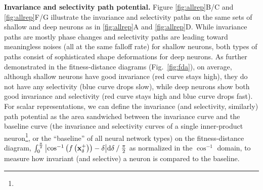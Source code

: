 \documentclass[10pt,twocolumn,letterpaper]{article}
\begin{document}
{\bf Invariance and selectivity path potential.} Figure \ref{fig:allrep}B/C and \ref{fig:allrep}F/G illustrate the invariance and selectivity paths on the same sets of shallow and deep neurons as in \ref{fig:allrep}A and \ref{fig:allrep}D.
While invariance paths are mostly phase changes and selectivity paths are leading toward meaningless noises (all at the same falloff rate) for shallow neurons, both types of paths consist of sophisticated shape deformations for deep neurons.
As further demonstrated in the fitness-distance diagrams \cite{jones1995fitness} (Fig.~\ref{fig:fda}), on average, although shallow neurons have good invariance (\ie red curve stays high), they do not have any selectivity (\ie blue curve drops slow), while deep neurons show both good invariance and selectivity (\ie red curve stays high and blue curve drops fast).
For scalar representations, we can define the invariance (and selectivity, similarly) path potential as the area sandwiched between the invariance curve and the baseline curve (\ie the invariance and selectivity curves of a single inner-product neuron\footnote{}, or the ``baseline'' of all neural network types) on the fitness-distance diagram, \ie $\int_{0}^{\frac{\pi}{2}}{\left| \cos^{-1}\left(f\left( \bf{x}^{+}_{\delta} \right)\right) - \delta \right|}\mathrm{d}\delta \mathbin{/} {\frac{\pi}{2}}$ as normalized in the $\cos^{-1}$ domain, to measure how invariant (and selective) a neuron is compared to the baseline.

\end{document}
